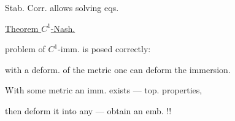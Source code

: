 \begin{flushright}\end{flushright}







Stab. Corr. allows solving eqs.





\underline{Theorem $C^1$-Nash.}





problem of $C^1$-imm. is posed correctly:

with a deform. of the metric one can deform the immersion.





With some metric an imm. exists --- top. properties,

then deform it into any --- obtain an emb. !!





